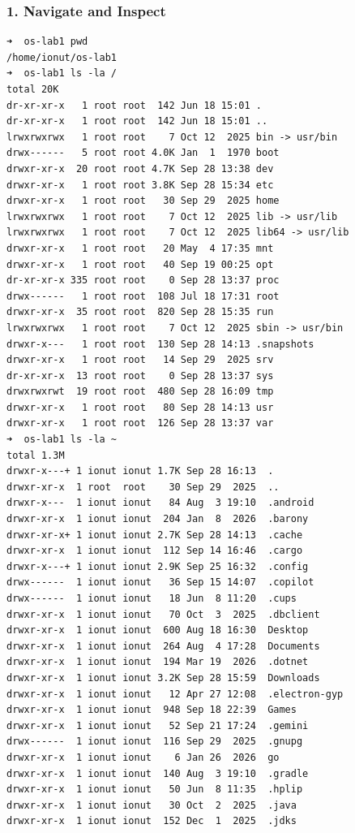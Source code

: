 \documentclass{labreport}
\begin{document}
\subsubsection{1. Navigate and Inspect}
\begin{lstlisting}[style=bash]
➜  os-lab1 pwd
/home/ionut/os-lab1
➜  os-lab1 ls -la /
total 20K
dr-xr-xr-x   1 root root  142 Jun 18 15:01 .
dr-xr-xr-x   1 root root  142 Jun 18 15:01 ..
lrwxrwxrwx   1 root root    7 Oct 12  2025 bin -> usr/bin
drwx------   5 root root 4.0K Jan  1  1970 boot
drwxr-xr-x  20 root root 4.7K Sep 28 13:38 dev
drwxr-xr-x   1 root root 3.8K Sep 28 15:34 etc
drwxr-xr-x   1 root root   30 Sep 29  2025 home
lrwxrwxrwx   1 root root    7 Oct 12  2025 lib -> usr/lib
lrwxrwxrwx   1 root root    7 Oct 12  2025 lib64 -> usr/lib
drwxr-xr-x   1 root root   20 May  4 17:35 mnt
drwxr-xr-x   1 root root   40 Sep 19 00:25 opt
dr-xr-xr-x 335 root root    0 Sep 28 13:37 proc
drwx------   1 root root  108 Jul 18 17:31 root
drwxr-xr-x  35 root root  820 Sep 28 15:35 run
lrwxrwxrwx   1 root root    7 Oct 12  2025 sbin -> usr/bin
drwxr-x---   1 root root  130 Sep 28 14:13 .snapshots
drwxr-xr-x   1 root root   14 Sep 29  2025 srv
dr-xr-xr-x  13 root root    0 Sep 28 13:37 sys
drwxrwxrwt  19 root root  480 Sep 28 16:09 tmp
drwxr-xr-x   1 root root   80 Sep 28 14:13 usr
drwxr-xr-x   1 root root  126 Sep 28 13:37 var
➜  os-lab1 ls -la ~
total 1.3M
drwxr-x---+ 1 ionut ionut 1.7K Sep 28 16:13  .
drwxr-xr-x  1 root  root    30 Sep 29  2025  ..
drwxr-x---  1 ionut ionut   84 Aug  3 19:10  .android
drwxr-xr-x  1 ionut ionut  204 Jan  8  2026  .barony
drwxr-xr-x+ 1 ionut ionut 2.7K Sep 28 14:13  .cache
drwxr-xr-x  1 ionut ionut  112 Sep 14 16:46  .cargo
drwxr-x---+ 1 ionut ionut 2.9K Sep 25 16:32  .config
drwx------  1 ionut ionut   36 Sep 15 14:07  .copilot
drwx------  1 ionut ionut   18 Jun  8 11:20  .cups
drwxr-xr-x  1 ionut ionut   70 Oct  3  2025  .dbclient
drwxr-xr-x  1 ionut ionut  600 Aug 18 16:30  Desktop
drwxr-xr-x  1 ionut ionut  264 Aug  4 17:28  Documents
drwxr-xr-x  1 ionut ionut  194 Mar 19  2026  .dotnet
drwxr-xr-x  1 ionut ionut 3.2K Sep 28 15:59  Downloads
drwxr-xr-x  1 ionut ionut   12 Apr 27 12:08  .electron-gyp
drwxr-xr-x  1 ionut ionut  948 Sep 18 22:39  Games
drwxr-xr-x  1 ionut ionut   52 Sep 21 17:24  .gemini
drwx------  1 ionut ionut  116 Sep 29  2025  .gnupg
drwxr-xr-x  1 ionut ionut    6 Jan 26  2026  go
drwxr-xr-x  1 ionut ionut  140 Aug  3 19:10  .gradle
drwxr-xr-x  1 ionut ionut   50 Jun  8 11:35  .hplip
drwxr-xr-x  1 ionut ionut   30 Oct  2  2025  .java
drwxr-xr-x  1 ionut ionut  152 Dec  1  2025  .jdks

\end{lstlisting}
\end{document}
